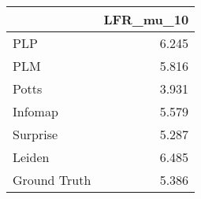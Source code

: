 \begin{tabular}{lr}
\toprule
{} & LFR_mu_10 \\
\midrule
PLP          &     6.245 \\
PLM          &     5.816 \\
Potts        &     3.931 \\
Infomap      &     5.579 \\
Surprise     &     5.287 \\
Leiden       &     6.485 \\
Ground Truth &     5.386 \\
\bottomrule
\end{tabular}
